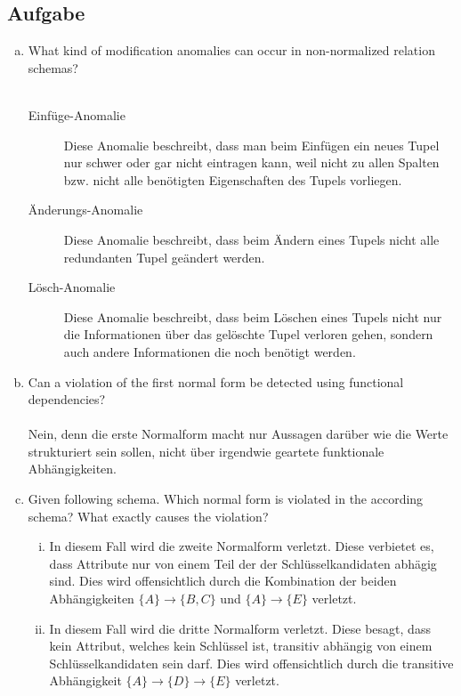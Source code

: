 \documentclass[11pt,a4paper,DIV=9]{scrartcl}
\newcounter{temp}
\newcommand{\aufgabe}[1]{
  \setcounter{temp}{\value{subsection}}
  \setcounter{subsection}{#1}
  \addtocounter{subsection}{-1}
  \subsection{Aufgabe}
  \setcounter{subsection}{\value{temp}}
}
\begin{document}
\aufgabe{3}
  \begin{enumerate}[a.]
    \item What kind of modification anomalies can occur in non-normalized relation schemas? \\\\
      \begin{description}
        \item[Einf\"uge-Anomalie]  Diese Anomalie beschreibt, dass man beim Einf\"ugen ein neues Tupel nur schwer oder gar nicht eintragen kann, weil nicht zu allen Spalten bzw. nicht alle ben\"otigten Eigenschaften des Tupels vorliegen.
        \item[\"Anderungs-Anomalie] Diese Anomalie beschreibt, dass beim \"Andern eines Tupels nicht alle redundanten Tupel ge\"andert werden. 
        \item[L\"osch-Anomalie] Diese Anomalie beschreibt, dass beim L\"oschen eines Tupels nicht nur die Informationen \"uber das gel\"oschte Tupel verloren gehen, sondern auch andere Informationen die noch ben\"otigt werden.
      \end{description}
    \item Can a violation of the first normal form be detected using functional dependencies? \\\\
      Nein, denn die erste Normalform macht nur Aussagen darüber wie die Werte strukturiert sein sollen, nicht über irgendwie geartete funktionale Abhängigkeiten.
    \item Given following schema. Which normal form is violated in the according schema? What exactly causes the
    violation?
      \begin{enumerate}[i.]
        \item In diesem Fall wird die zweite Normalform verletzt. Diese verbietet es, dass Attribute nur von einem Teil der der Schlüsselkandidaten abhägig sind. Dies wird offensichtlich durch die Kombination der beiden Abhängigkeiten $\{A\} \rightarrow \{B,C\}$ und $\{A\} \rightarrow \{E\}$ verletzt.
        \item In diesem Fall wird die dritte Normalform verletzt. Diese besagt, dass kein Attribut, welches kein Schlüssel ist, transitiv abhängig von einem Schlüsselkandidaten sein darf. Dies wird offensichtlich durch die transitive Abhängigkeit $\{A\} \rightarrow \{D\} \rightarrow \{E\}$ verletzt.
      \end{enumerate}
  \end{enumerate}
\end{document}
